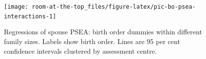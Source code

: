 \documentclass[
]{article}
\begin{document}
\begin{figure}

{\centering \texttt{[image: room-at-the-top\_files/figure-latex/pic-bo-psea-interactions-1]} 

}

\caption{Regressions of spouse PSEA: birth order dummies within different family sizes. Labels show birth order. Lines are 95 per cent confidence intervals clustered by assessment centre. }\label{fig:pic-bo-psea-interactions}
\end{figure}

 
  \providecommand{\huxb}[2]{\arrayrulecolor[RGB]{#1}\global\arrayrulewidth=#2pt}
  \providecommand{\huxvb}[2]{\color[RGB]{#1}\vrule width #2pt}
  \providecommand{\huxtpad}[1]{\rule{0pt}{#1}}
  \providecommand{\huxbpad}[1]{\rule[-#1]{0pt}{#1}}
\end{document}

